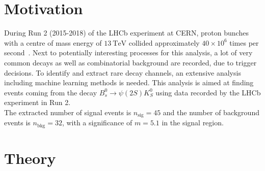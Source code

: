 \section{Motivation}

During Run 2 (2015-2018) of the LHCb experiment at CERN, proton bunches with a centre of mass energy of $\qty{13}{\tera\electronvolt}$ collided approximately $40 \times 10^6$ times per second~\cite{LHCb_MVA}.
Next to potentially interesting processes for this analysis, a lot of very common decays as well as combinatorial background are recorded, due to trigger decisions. To identify and extract rare decay channels, an extensive analysis including machine learning methods is needed.
This analysis is aimed at finding events coming from the decay $B_s^0 \to \psi (2S)K_S^0$ using data recorded by the LHCb experiment in Run 2.\\
The extracted number of signal events is $n_\text{sig} = \num{45}$ and the number of background events is $n_\text{bkg} = \num{32}$, with a significance of $m = \num{5.1}$ in the signal region.

\section{Theory}
\label{sec:Theorie}

